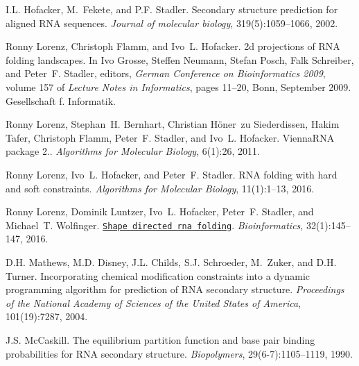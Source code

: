 \begin{DoxyDescription}
\item[\label{_CITEREF_hofacker:2002}%
\mbox{[}9\mbox{]}]I.\+L. Hofacker, M.~Fekete, and P.\+F. Stadler. Secondary structure prediction for aligned R\+NA sequences. {\itshape Journal of molecular biology}, 319(5)\+:1059--1066, 2002.


\item[\label{_CITEREF_lorenz:2009}%
\mbox{[}10\mbox{]}]Ronny Lorenz, Christoph Flamm, and Ivo~L. Hofacker. 2d projections of R\+NA folding landscapes. In Ivo Grosse, Steffen Neumann, Stefan Posch, Falk Schreiber, and Peter~F. Stadler, editors, {\itshape German Conference on Bioinformatics 2009}, volume 157 of {\itshape Lecture Notes in Informatics}, pages 11--20, Bonn, September 2009. Gesellschaft f. Informatik.


\item[\label{_CITEREF_lorenz:2011}%
\mbox{[}11\mbox{]}]Ronny Lorenz, Stephan~H. Bernhart, Christian H\"{o}ner~zu Siederdissen, Hakim Tafer, Christoph Flamm, Peter~F. Stadler, and Ivo~L. Hofacker. Vienna\+R\+NA package 2.. {\itshape Algorithms for Molecular Biology}, 6(1)\+:26, 2011. 


\item[\label{_CITEREF_lorenz:2016b}%
\mbox{[}12\mbox{]}]Ronny Lorenz, Ivo~L. Hofacker, and Peter~F. Stadler. R\+NA folding with hard and soft constraints. {\itshape Algorithms for Molecular Biology}, 11(1)\+:1--13, 2016. 


\item[\label{_CITEREF_lorenz:2016a}%
\mbox{[}13\mbox{]}]Ronny Lorenz, Dominik Luntzer, Ivo~L. Hofacker, Peter~F. Stadler, and Michael~T. Wolfinger. \href{http://bioinformatics.oxfordjournals.org/content/32/1/145.abstract}{\tt Shape directed rna folding}. {\itshape Bioinformatics}, 32(1)\+:145--147, 2016. 


\item[\label{_CITEREF_mathews:2004}%
\mbox{[}14\mbox{]}]D.\+H. Mathews, M.\+D. Disney, J.\+L. Childs, S.\+J. Schroeder, M.~Zuker, and D.\+H. Turner. Incorporating chemical modification constraints into a dynamic programming algorithm for prediction of R\+NA secondary structure. {\itshape Proceedings of the National Academy of Sciences of the United States of America}, 101(19)\+:7287, 2004.


\item[\label{_CITEREF_mccaskill:1990}%
\mbox{[}15\mbox{]}]J.\+S. Mc\+Caskill. The equilibrium partition function and base pair binding probabilities for R\+NA secondary structure. {\itshape Biopolymers}, 29(6-\/7)\+:1105--1119, 1990.



\end{DoxyDescription}
